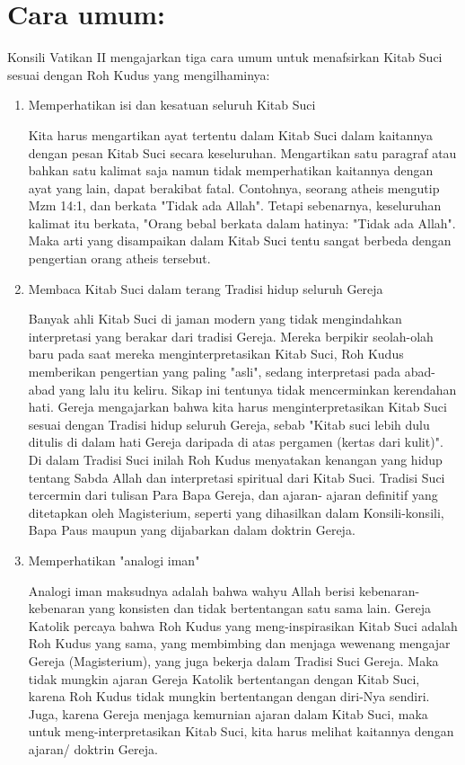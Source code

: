 \section*{Cara umum:}
Konsili Vatikan II mengajarkan tiga cara umum untuk menafsirkan Kitab Suci sesuai dengan Roh Kudus yang mengilhaminya:
\begin{enumerate}
\item Memperhatikan isi dan kesatuan seluruh Kitab Suci

Kita harus mengartikan ayat tertentu dalam Kitab Suci dalam kaitannya dengan pesan Kitab Suci secara keseluruhan. Mengartikan satu paragraf atau bahkan satu kalimat saja namun tidak memperhatikan kaitannya dengan ayat yang lain, dapat berakibat fatal. Contohnya, seorang atheis mengutip Mzm 14:1, dan berkata "Tidak ada Allah". Tetapi sebenarnya, keseluruhan kalimat itu berkata, "Orang bebal berkata dalam hatinya: "Tidak ada Allah". Maka arti yang disampaikan dalam Kitab Suci tentu sangat berbeda dengan pengertian orang atheis tersebut.

\item Membaca Kitab Suci dalam terang Tradisi hidup seluruh Gereja

Banyak ahli Kitab Suci di jaman modern yang tidak mengindahkan interpretasi yang berakar dari tradisi Gereja. Mereka berpikir seolah-olah baru pada saat mereka menginterpretasikan Kitab Suci, Roh Kudus memberikan pengertian yang paling "asli", sedang interpretasi pada abad- abad yang lalu itu keliru. Sikap ini tentunya tidak mencerminkan kerendahan hati. Gereja mengajarkan bahwa kita harus menginterpretasikan Kitab Suci sesuai dengan Tradisi hidup seluruh Gereja, sebab "Kitab suci lebih dulu ditulis di dalam hati Gereja daripada di atas pergamen (kertas dari kulit)". Di dalam Tradisi Suci inilah Roh Kudus menyatakan kenangan yang hidup tentang Sabda Allah dan interpretasi spiritual dari Kitab Suci. Tradisi Suci tercermin dari tulisan Para Bapa Gereja, dan ajaran- ajaran definitif yang ditetapkan oleh Magisterium, seperti yang dihasilkan dalam Konsili-konsili, Bapa Paus maupun yang dijabarkan dalam doktrin Gereja.

\item Memperhatikan "analogi iman"

Analogi iman maksudnya adalah bahwa wahyu Allah berisi kebenaran- kebenaran yang konsisten dan tidak bertentangan satu sama lain. Gereja Katolik percaya bahwa Roh Kudus yang meng-inspirasikan Kitab Suci adalah Roh Kudus yang sama, yang membimbing dan menjaga wewenang mengajar Gereja (Magisterium), yang juga bekerja dalam Tradisi Suci Gereja. Maka tidak mungkin ajaran Gereja Katolik bertentangan dengan Kitab Suci, karena Roh Kudus tidak mungkin bertentangan dengan diri-Nya sendiri. Juga, karena Gereja menjaga kemurnian ajaran dalam Kitab Suci, maka untuk meng-interpretasikan Kitab Suci, kita harus melihat kaitannya dengan ajaran/ doktrin Gereja.


\end{enumerate}
